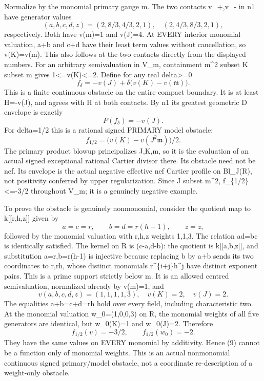 \documentclass[11pt]{article}
\begin{document}
Normalize by the monomial primary gauge m. The two contacts v\_+,v\_- in n1 have generator values
\[
 (a,b,c,d,z)=(2,8/3,4/3,2,1),\quad (2,4/3,8/3,2,1),
\]
respectively. Both have v(m)=1 and v(J)=4. At EVERY interior monomial valuation, a+b and c+d have their least term values without cancellation, so v(K)=v(m). This also follows at the two contacts directly from the displayed numbers. For an arbitrary semivaluation in V\_m, containment m\textasciicircum{}2 subset K subset m gives 1<=v(K)<=2. Define for any real delta>=0
\[
 f_\delta=-v(J)+\delta\big(v(K)-v(\mathfrak m)\big).
                                                                    \tag{9}
\]
This is a finite continuous obstacle on the entire compact boundary. It is at least H=-v(J), and agrees with H at both contacts. By n1 its greatest geometric D envelope is exactly
\[
 P(f_\delta)=-v(J).
                                                                    \tag{10}
\]
For delta=1/2 this is a rational signed PRIMARY model obstacle:
\[
 f_{1/2}=\big(v(K)-v(J^2\mathfrak m)\big)/2.
\]
The primary product blowup principalizes J,K,m, so it is the evaluation of an actual signed exceptional rational Cartier divisor there. Its obstacle need not be nef. Its envelope is the actual negative effective nef Cartier profile on Bl\_J(R), not positivity conferred by upper regularization. Since J subset m\textasciicircum{}2, f\_\{1/2\}<=-3/2 throughout V\_m; it is a genuinely negative example.

To prove the obstacle is genuinely nonmonomial, consider the quotient map to k[[r,h,z]] given by
\[
 a=c=r,\qquad b=d=r(h-1),\qquad z=z,
\]
followed by the monomial valuation with r,h,z weights 1,1,3. The relation ad=bc is identically satisfied. The kernel on R is (c-a,d-b): the quotient is k[[a,b,z]], and substitution a=r,b=r(h-1) is injective because replacing b by a+b sends its two coordinates to r,rh, whose distinct monomials r\textasciicircum{}\{i+j\}h\textasciicircum{}j have distinct exponent pairs. This is a prime support strictly below m. It is an allowed centred semivaluation, normalized already by v(m)=1, and
\[
 v(a,b,c,d,z)=(1,1,1,1,3),\quad v(K)=2,\quad v(J)=2.
\]
The equalities a+b=c+d=rh hold over every field, including characteristic two. At the monomial valuation w\_0=(1,0,0,3) on R, the monomial weights of all five generators are identical, but w\_0(K)=1 and w\_0(J)=2. Therefore
\[
 f_{1/2}(v)=-3/2,\qquad f_{1/2}(w_0)=-2.
\]
They have the same values on EVERY monomial by additivity. Hence (9) cannot be a function only of monomial weights. This is an actual nonmonomial continuous signed primary/model obstacle, not a coordinate re-description of a weight-only obstacle.
\end{document}
